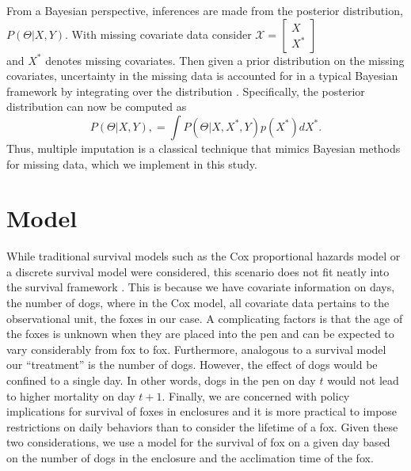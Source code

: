 \documentclass[aoas,preprint]{imsart}
\numberwithin{equation}{section}
\theoremstyle{plain}
\begin{document}
From a Bayesian perspective, inferences are made from the posterior distribution, $P(\Theta|X,Y).$ With missing covariate data consider $
	\mathcal{X}=\left[
	\begin{array}{ll}
	X \\
	X^{*} 
	\end{array}
	\right]$ \\ 
	and $X^{*}$ denotes missing covariates. Then given a prior distribution on the missing covariates, uncertainty in the missing data is accounted for in a typical Bayesian framework by integrating over the distribution \citep{boone2009}. Specifically, the posterior distribution can now be computed as $$P(\Theta|X,Y), = \int P(\Theta|X,X^{*},Y) p(X^{*}) dX^{*}.$$
Thus, multiple imputation is a classical technique that mimics Bayesian methods for missing data, which we implement in this study.
\section{Model} While traditional survival models such as the Cox proportional hazards model \citep{cox} or a discrete survival model were considered, this scenario does not fit neatly into the survival framework \citep{klein}. This is because we have covariate information on days, the number of dogs, where in the Cox model, all covariate data pertains to the observational unit, the foxes in our case. A complicating factors is that the age of the foxes is unknown when they are placed into the pen and can be expected to vary considerably from fox to fox. Furthermore, analogous to a survival model our ``treatment'' is the number of dogs. However, the effect of dogs would be confined to a single day. In other words, dogs in the pen on day $t$ would not lead to higher mortality on day $t+1$. Finally, we are concerned with policy implications for survival of foxes in enclosures and it is more practical to impose restrictions on daily behaviors than to consider the lifetime of a fox. Given these two considerations, we use a model for the survival of fox on a given day based on the number of dogs in the enclosure and the acclimation time of the fox.
\end{document}
